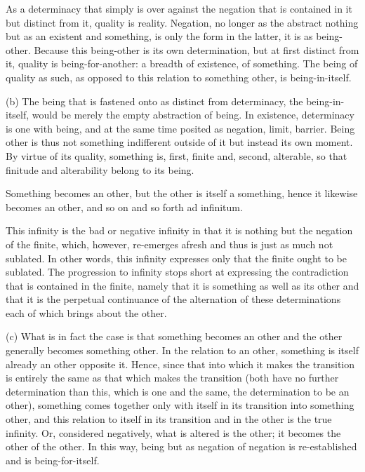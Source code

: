 As a determinacy that simply is over against
the negation that is contained in it but distinct from it,
quality is reality.
Negation, no longer as the abstract nothing
but as an existent and something,
is only the form in the latter,
it is as being-other.
Because this being-other is its own determination,
but at first distinct from it,
quality is being-for-another:
a breadth of existence, of something.
The being of quality as such,
as opposed to this relation to something other,
is being-in-itself.

(b) The being that is fastened onto as distinct from determinacy,
the being-in-itself, would be merely the empty abstraction of being.
In existence, determinacy is one with being,
and at the same time posited as negation, limit, barrier.
Being other is thus not something indifferent outside of it
but instead its own moment.
By virtue of its quality, something is,
first, finite and, second, alterable,
so that finitude and alterability belong to its being.

Something becomes an other,
but the other is itself a something,
hence it likewise becomes an other,
and so on and so forth ad infinitum.

This infinity is the bad or negative infinity in that
it is nothing but the negation of the finite, which, however,
re-emerges afresh and thus is just as much not sublated.
In other words, this infinity expresses only that
the finite ought to be sublated.
The progression to infinity stops short at expressing
the contradiction that is contained in the finite,
namely that it is something as well as its other
and that it is the perpetual continuance of
the alternation of these determinations
each of which brings about the other.

(c) What is in fact the case is that something becomes an other
and the other generally becomes something other.
In the relation to an other,
something is itself already an other opposite it.
Hence, since that into which it makes the transition is
entirely the same as that which makes the transition
(both have no further determination than this,
which is one and the same, the determination to be an other),
something comes together only with itself
in its transition into something other,
and this relation to itself in its transition
and in the other is the true infinity.
Or, considered negatively, what is altered is the other;
it becomes the other of the other.
In this way, being but as negation of negation is
re-established and is being-for-itself.

